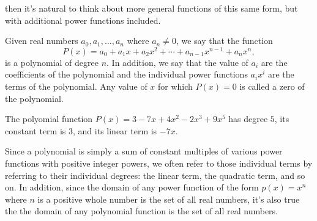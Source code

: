 \documentclass{ximera}
\begin{document}
then it's natural to think about more general functions of this same form, but with additional power functions included.%
\begin{definition}
Given real numbers $a_0, a_1, \ldots, a_n$ where $a_n \ne 0$, we say that the function%
\[
P(x) = a_0 + a_1 x + a_2 x^2 + \cdots + a_{n-1}x^{n-1} + a_n x^n, 
\]
is a polynomial of degree $n$.  In addition, we say that the value of $a_i$ are the coefficients of the polynomial and the individual power functions $a_i x^i$ are the terms of the polynomial. Any value of $x$ for which $P(x) = 0$ is called a zero of the polynomial.  
\end{definition}
\begin{example}
The polyomial function $P(x) = 3 - 7x + 4x^2 - 2x^3 + 9x^5$ has degree $5$, its constant term is $3$, and its linear term is $-7x$.%
\end{example}
Since a polynomial is simply a sum of constant multiples of various power functions with positive integer powers, we often refer to those individual terms by referring to their individual degrees:  the linear term, the quadratic term, and so on.  In addition, since the domain of any power function of the form $p(x) = x^n$ where $n$ is a positive whole number is the set of all real numbers, it's also true the the domain of any polynomial function is the set of all real numbers.%
\end{document}
